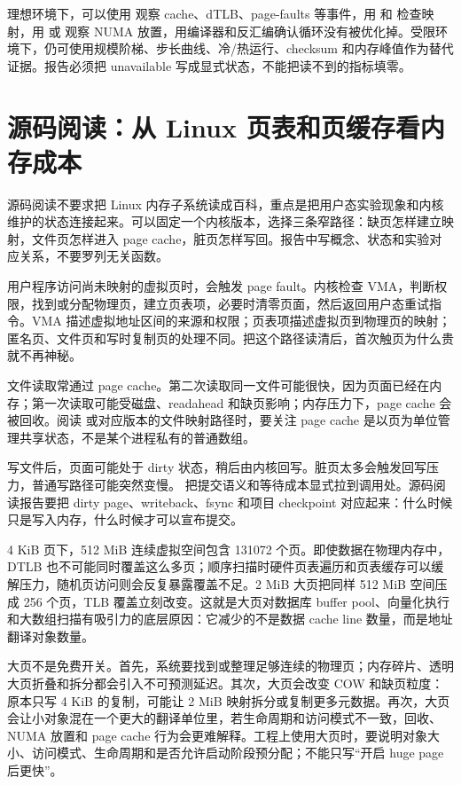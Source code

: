 理想环境下，可以使用  观察 cache、dTLB、page-faults 等事件，用  和  检查映射，用  或  观察 NUMA 放置，用编译器和反汇编确认循环没有被优化掉。受限环境下，仍可使用规模阶梯、步长曲线、冷/热运行、checksum 和内存峰值作为替代证据。报告必须把 unavailable 写成显式状态，不能把读不到的指标填零。

\section{源码阅读：从 Linux 页表和页缓存看内存成本}

源码阅读不要求把 Linux 内存子系统读成百科，重点是把用户态实验现象和内核维护的状态连接起来。可以固定一个内核版本，选择三条窄路径：缺页怎样建立映射，文件页怎样进入 page cache，脏页怎样写回。报告中写概念、状态和实验对应关系，不要罗列无关函数。

用户程序访问尚未映射的虚拟页时，会触发 page fault。内核检查 VMA，判断权限，找到或分配物理页，建立页表项，必要时清零页面，然后返回用户态重试指令。VMA 描述虚拟地址区间的来源和权限；页表项描述虚拟页到物理页的映射；匿名页、文件页和写时复制页的处理不同。把这个路径读清后，首次触页为什么贵就不再神秘。

文件读取常通过 page cache。第二次读取同一文件可能很快，因为页面已经在内存；第一次读取可能受磁盘、readahead 和缺页影响；内存压力下，page cache 会被回收。阅读  或对应版本的文件映射路径时，要关注 page cache 是以页为单位管理共享状态，不是某个进程私有的普通数组。

写文件后，页面可能处于 dirty 状态，稍后由内核回写。脏页太多会触发回写压力，普通写路径可能突然变慢。 把提交语义和等待成本显式拉到调用处。源码阅读报告要把 dirty page、writeback、fsync 和项目 checkpoint 对应起来：什么时候只是写入内存，什么时候才可以宣布提交。

4 KiB 页下，512 MiB 连续虚拟空间包含 131072 个页。即使数据在物理内存中，DTLB 也不可能同时覆盖这么多页；顺序扫描时硬件页表遍历和页表缓存可以缓解压力，随机页访问则会反复暴露覆盖不足。2 MiB 大页把同样 512 MiB 空间压成 256 个页，TLB 覆盖立刻改变。这就是大页对数据库 buffer pool、向量化执行和大数组扫描有吸引力的底层原因：它减少的不是数据 cache line 数量，而是地址翻译对象数量。

大页不是免费开关。首先，系统要找到或整理足够连续的物理页；内存碎片、透明大页折叠和拆分都会引入不可预测延迟。其次，大页会改变 COW 和缺页粒度：原本只写 4 KiB 的复制，可能让 2 MiB 映射拆分或复制更多元数据。再次，大页会让小对象混在一个更大的翻译单位里，若生命周期和访问模式不一致，回收、NUMA 放置和 page cache 行为会更难解释。工程上使用大页时，要说明对象大小、访问模式、生命周期和是否允许启动阶段预分配；不能只写“开启 huge page 后更快”。

